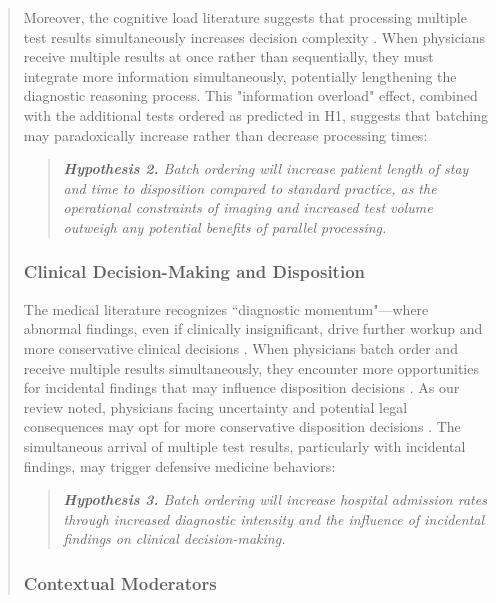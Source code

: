 \documentclass[11pt]{article}
\newcommand{\1}{\hbox{\rm 1\kern-.35em 1}}
\begin{document}
{\begin{quote}
Moreover, the cognitive load literature suggests that processing multiple test results simultaneously increases decision complexity \cite{kc2013does}. When physicians receive multiple results at once rather than sequentially, they must integrate more information simultaneously, potentially lengthening the diagnostic reasoning process. This "information overload" effect, combined with the additional tests ordered as predicted in H1, suggests that batching may paradoxically increase rather than decrease processing times:

\begin{quote}
\small
\textit{\textbf{Hypothesis 2.} Batch ordering will increase patient length of stay and time to disposition compared to standard practice, as the operational constraints of imaging and increased test volume outweigh any potential benefits of parallel processing.}
\end{quote}

\subsubsection*{Clinical Decision-Making and Disposition}

The medical literature recognizes ``diagnostic momentum"---where abnormal findings, even if clinically insignificant, drive further workup and more conservative clinical decisions \cite{coen2022clinical; featherston2020decision}. When physicians batch order and receive multiple results simultaneously, they encounter more opportunities for incidental findings that may influence disposition decisions \cite{lumbreras2010incidental, berlin2011incidentaloma}. As our review noted, physicians facing uncertainty and potential legal consequences may opt for more conservative disposition decisions \cite{rao2012overuse, lam2020why}. The simultaneous arrival of multiple test results, particularly with incidental findings, may trigger defensive medicine behaviors:

\begin{quote}
\small
\textit{\textbf{Hypothesis 3.} Batch ordering will increase hospital admission rates through increased diagnostic intensity and the influence of incidental findings on clinical decision-making.}
\end{quote}

\subsubsection*{Contextual Moderators}


\end{quote}}
\end{document}
